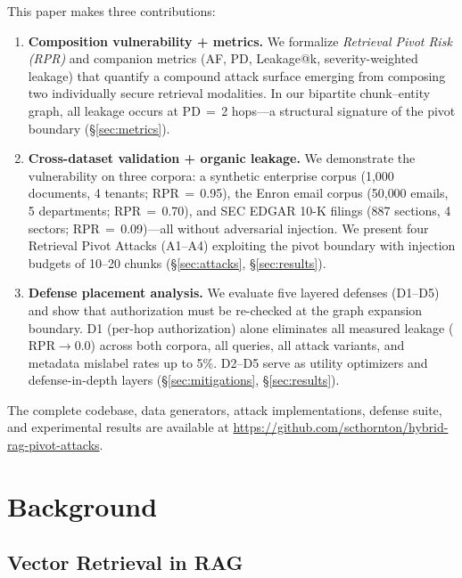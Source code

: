 \documentclass[letterpaper,twocolumn,10pt]{article}
\begin{document}
This paper makes three contributions:

\begin{enumerate}
\item \textbf{Composition vulnerability + metrics.} We formalize
  \emph{Retrieval Pivot Risk (RPR)} and companion metrics (AF, PD,
  Leakage@k, severity-weighted leakage) that quantify a compound
  attack surface emerging from composing two individually secure
  retrieval modalities. In our bipartite chunk--entity graph,
  all leakage occurs at PD\,$=$\,2 hops---a structural signature of
  the pivot boundary (\S\ref{sec:metrics}).

\item \textbf{Cross-dataset validation + organic leakage.} We
  demonstrate the vulnerability on three corpora: a synthetic enterprise
  corpus (1{,}000 documents, 4 tenants; RPR\,$=$\,0.95), the Enron email
  corpus (50{,}000 emails, 5 departments; RPR\,$=$\,0.70), and SEC EDGAR
  10-K filings (887 sections, 4 sectors; RPR\,$=$\,0.09)---all without
  adversarial injection. We present four
  Retrieval Pivot Attacks (A1--A4) exploiting the pivot boundary with
  injection budgets of 10--20 chunks
  (\S\ref{sec:attacks}, \S\ref{sec:results}).

\item \textbf{Defense placement analysis.} We evaluate five layered
  defenses (D1--D5) and show that authorization must be re-checked at
  the graph expansion boundary. D1 (per-hop authorization) alone
  eliminates all measured leakage ($\text{RPR} \to 0.0$) across both
  corpora, all queries, all attack variants, and metadata mislabel
  rates up to 5\%. D2--D5 serve as utility optimizers and
  defense-in-depth layers
  (\S\ref{sec:mitigations}, \S\ref{sec:results}).
\end{enumerate}

The complete codebase, data generators, attack implementations,
defense suite, and experimental results are available at
\url{https://github.com/scthornton/hybrid-rag-pivot-attacks}.

\section{Background}
\label{sec:background}

\subsection{Vector Retrieval in RAG}
\end{document}
